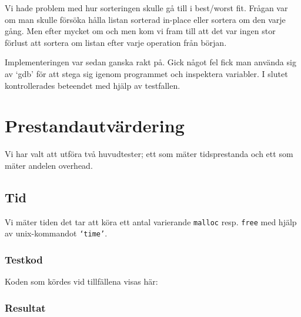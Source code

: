 \documentclass[a4paper,10pt,titlepage]{article}
\begin{document}
Vi hade problem med hur sorteringen skulle gå till i best/worst fit. Frågan var om man skulle försöka hålla listan sorterad in-place eller sortera om den varje gång. Men efter mycket om och men kom vi fram till att det var ingen stor förlust att sortera om listan efter varje operation från början.

Implementeringen var sedan ganska rakt på. Gick något fel fick man använda sig av `gdb' för att stega sig igenom programmet och inspektera variabler. I slutet kontrollerades beteendet med hjälp av testfallen.

\newpage
\section{Prestandautvärdering}


Vi har valt att utföra två huvudtester; ett som mäter tidsprestanda och ett som mäter andelen overhead.

\subsection{Tid}

Vi mäter tiden det tar att köra ett antal varierande \texttt{malloc} resp. \texttt{free} med hjälp av unix-kommandot \texttt{`time'}.


\subsubsection{Testkod}

Koden som kördes vid tillfällena visas här:

\scriptsize{}
\normalsize

\subsubsection{Resultat}
\end{document}
